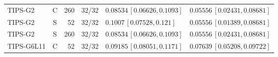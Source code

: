 \begin{longtable}{lcrcp{44mm}p{44mm}}
TIPS-G2 & C & 260 & 32/32 & \(0.08534\,[0.06626,0.1093]\) & \(0.05556\,[0.02431,0.08681]\)\\
TIPS-G2 & S & 52 & 32/32 & \(0.1007\,[0.07528,0.121]\) & \(0.05556\,[0.01389,0.08681]\)\\
TIPS-G2 & S & 260 & 32/32 & \(0.08534\,[0.06626,0.1093]\) & \(0.05556\,[0.02431,0.08681]\)\\
TIPS-G6L11 & C & 52 & 32/32 & \(0.09185\,[0.08051,0.1171]\) & \(0.07639\,[0.05208,0.09722]\)\\

\end{longtable}
